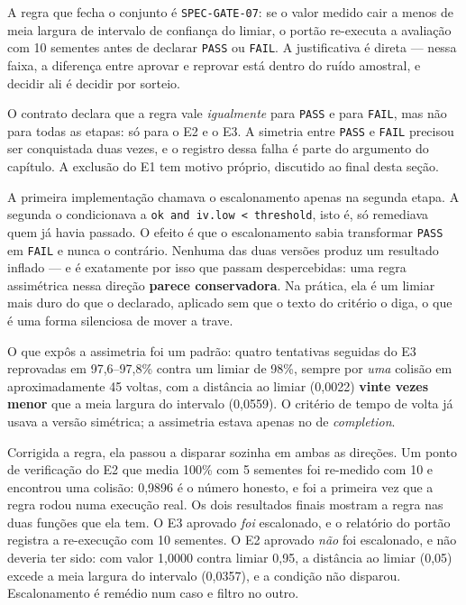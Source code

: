 A regra que fecha o conjunto é \texttt{SPEC-GATE-07}: se o valor medido cair a
menos de meia largura de intervalo de confiança do limiar, o portão re-executa a
avaliação com 10 sementes antes de declarar \texttt{PASS} ou \texttt{FAIL}. A
justificativa é direta --- nessa faixa, a diferença entre aprovar e reprovar está
dentro do ruído amostral, e decidir ali é decidir por sorteio.

O contrato declara que a regra vale \textit{igualmente} para \texttt{PASS} e
para \texttt{FAIL}, mas não para todas as etapas: só para o E2 e o E3. A
simetria entre \texttt{PASS} e \texttt{FAIL} precisou ser conquistada duas
vezes, e o registro dessa falha é parte do argumento do capítulo. A exclusão do
E1 tem motivo próprio, discutido ao final desta seção.

A primeira implementação chamava o escalonamento apenas na segunda etapa. A
segunda o condicionava a \texttt{ok and iv.low < threshold}, isto é, só remediava
quem já havia passado. O efeito é que o escalonamento sabia transformar
\texttt{PASS} em \texttt{FAIL} e nunca o contrário. Nenhuma das duas versões
produz um resultado inflado --- e é exatamente por isso que passam despercebidas:
uma regra assimétrica nessa direção \textbf{parece conservadora}. Na prática, ela
é um limiar mais duro do que o declarado, aplicado sem que o texto do critério o
diga, o que é uma forma silenciosa de mover a trave.

O que expôs a assimetria foi um padrão: quatro tentativas seguidas do E3
reprovadas em 97,6--97,8\% contra um limiar de 98\%, sempre por \textit{uma}
colisão em aproximadamente 45 voltas, com a distância ao limiar (0,0022)
\textbf{vinte vezes menor} que a meia largura do intervalo (0,0559). O critério
de tempo de volta já usava a versão simétrica; a assimetria estava apenas no de
\textit{completion}.

Corrigida a regra, ela passou a disparar sozinha em ambas as direções. Um ponto
de verificação do E2 que media 100\% com 5 sementes foi re-medido com 10 e
encontrou uma colisão: 0,9896 é o número honesto, e foi a primeira vez que a
regra rodou numa execução real. Os dois resultados finais mostram a regra nas
duas funções que ela tem. O E3 aprovado \textit{foi} escalonado, e o relatório
do portão registra a re-execução com 10 sementes. O E2 aprovado \textit{não} foi
escalonado, e não deveria ter sido: com valor 1,0000 contra
limiar 0,95, a distância ao limiar (0,05) excede a meia largura do intervalo
(0,0357), e a condição não disparou. Escalonamento é remédio num caso e filtro no
outro.

